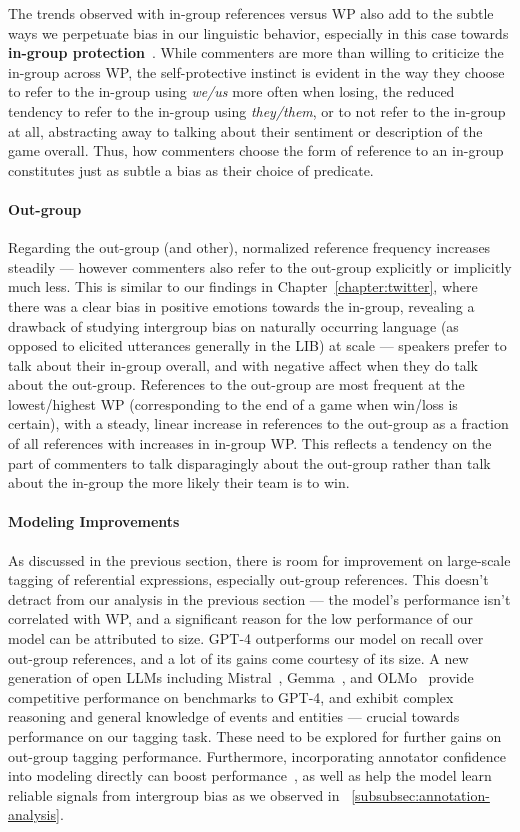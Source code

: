 The trends observed with in-group references versus WP also add to the subtle ways we perpetuate bias in our linguistic behavior, especially in this case towards \textbf{in-group protection}~\citep{maass_linguistic_1999}. While commenters are more than willing to criticize the in-group across WP, the self-protective instinct is evident in the way they choose to refer to the in-group using \emph{we/us} more often when losing, the reduced tendency to refer to the in-group using \emph{they/them}, or to not refer to the in-group at all, abstracting away to talking about their sentiment or description of the game overall. Thus, how commenters choose the form of reference to an in-group constitutes just as subtle a bias as their choice of predicate.

\paragraph{Out-group} Regarding the out-group (and other), normalized reference frequency increases steadily --- however commenters also refer to the out-group explicitly or implicitly much less. This is similar to our findings in Chapter~\ref{chapter:twitter}, where there was a clear bias in positive emotions towards the in-group, revealing a drawback of studying intergroup bias on naturally occurring language (as opposed to elicited utterances generally in the LIB) at scale --- speakers prefer to talk about their in-group overall, and with negative affect when they do talk about the out-group. References to the out-group are most frequent at the lowest/highest WP (corresponding to the end of a game when win/loss is certain), with a steady, linear increase in references to the out-group as a fraction of all references with increases in in-group WP. This reflects a tendency on the part of commenters to talk disparagingly about the out-group rather than talk about the in-group the more likely their team is to win.

\paragraph{Modeling Improvements} As discussed in the previous section, there is room for improvement on large-scale tagging of referential expressions, especially out-group references. This doesn't detract from our analysis in the previous section --- the model's performance isn't correlated with WP, and a significant reason for the low performance of our model can be attributed to size. GPT-4 outperforms our model on recall over out-group references, and a lot of its gains come courtesy of its size. A new generation of open LLMs including Mistral~\citep{jiang2023mistral}, Gemma~\cite{geminiteam2023gemini}, and OLMo~\citep{Groeneveld2023OLMo} provide competitive performance on benchmarks to GPT-4, and exhibit complex reasoning and general knowledge of events and entities --- crucial towards performance on our tagging task. These need to be explored for further gains on out-group tagging performance. Furthermore, incorporating annotator confidence into modeling directly can boost performance~\citep{atwell-etal-2022-role}, as well as help the model learn reliable signals from intergroup bias as we observed in \textsection~\ref{subsubsec:annotation-analysis}.
